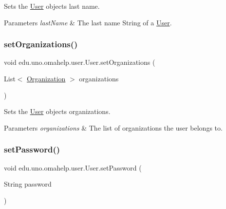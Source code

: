 Sets the \mbox{\hyperlink{classedu_1_1uno_1_1omahelp_1_1user_1_1_user}{User}} object\textquotesingle{}s last name.


\begin{DoxyParams}{Parameters}
{\em last\+Name} & The last name String of a \mbox{\hyperlink{classedu_1_1uno_1_1omahelp_1_1user_1_1_user}{User}}. \\
\hline
\end{DoxyParams}
\mbox{\label{classedu_1_1uno_1_1omahelp_1_1user_1_1_user_abb733bedac2ba4ae82096938e93cf203}} 
\subsubsection{\texorpdfstring{set\+Organizations()}{setOrganizations()}}
{\footnotesize\ttfamily void edu.\+uno.\+omahelp.\+user.\+User.\+set\+Organizations (\begin{DoxyParamCaption}\item[{List$<$ \mbox{\hyperlink{classedu_1_1uno_1_1omahelp_1_1organization_1_1_organization}{Organization}} $>$}]{organizations }\end{DoxyParamCaption})}

Sets the \mbox{\hyperlink{classedu_1_1uno_1_1omahelp_1_1user_1_1_user}{User}} object\textquotesingle{}s organizations.


\begin{DoxyParams}{Parameters}
{\em organizations} & The list of organizations the user belongs to. \\
\hline
\end{DoxyParams}
\mbox{\label{classedu_1_1uno_1_1omahelp_1_1user_1_1_user_a0ac39208ef908307df6146a676c2c1f9}} 
\subsubsection{\texorpdfstring{set\+Password()}{setPassword()}}
{\footnotesize\ttfamily void edu.\+uno.\+omahelp.\+user.\+User.\+set\+Password (\begin{DoxyParamCaption}\item[{String}]{password }\end{DoxyParamCaption})}

